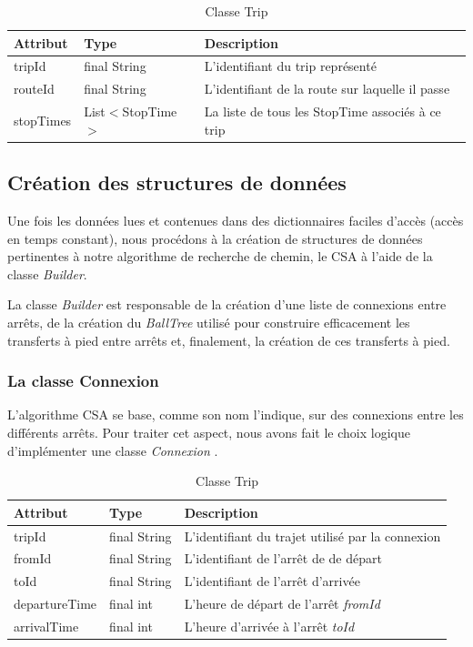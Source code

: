 \documentclass[12pt]{article}
\begin{document}
\begin{table}[h]
    \centering
    \begin{tabular}{|l|l|p{8cm}|}
    \hline
    \textbf{Attribut} & \textbf{Type} & \textbf{Description} \\ \hline
    tripId & final String & L'identifiant du trip représenté \\ \hline
    routeId & final String & L'identifiant de la route sur laquelle il passe \\ \hline
    stopTimes & List$<$StopTime$>$ &  La liste de tous les StopTime associés à ce trip \\ \hline
    \end{tabular}
    \caption{Classe Trip}
\end{table}

\subsection{Création des structures de données}
Une fois les données lues et contenues dans des dictionnaires faciles d'accès (accès en temps constant), nous procédons à la création de structures de données
pertinentes à notre algorithme de recherche de chemin, le CSA à l'aide de la classe \emph{Builder}.

La classe \emph{Builder} est responsable de la création d'une liste de connexions entre arrêts, de la création du \emph{BallTree} utilisé pour construire efficacement les transferts à pied entre arrêts
et, finalement, la création de ces transferts à pied.

\subsubsection{La classe Connexion}
\label{sec:connexion}
L'algorithme CSA se base, comme son nom l'indique, sur des connexions entre les différents arrêts. Pour traiter cet aspect, nous avons fait le choix logique
d'implémenter une classe \emph{Connexion} \cite{dibbelt2017connection}.

\begin{table}[h]
    \centering
    \begin{tabular}{|l|l|p{8cm}|}
    \hline
    \textbf{Attribut} & \textbf{Type} & \textbf{Description} \\ \hline
    tripId & final String & L'identifiant du trajet utilisé par la connexion \\ \hline
    fromId & final String & L'identifiant de l'arrêt de de départ \\ \hline
    toId & final String &  L'identifiant de l'arrêt d'arrivée \\ \hline
    departureTime & final int & L'heure de départ de l'arrêt \emph{fromId} \\ \hline
    arrivalTime & final int & L'heure d'arrivée à l'arrêt \emph{toId} \\ \hline
    \end{tabular}
    \caption{Classe Trip}
\end{table}
\end{document}
